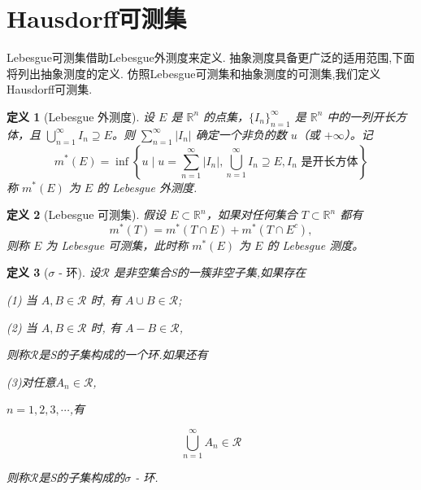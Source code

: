 \documentclass[hyperref,a4paper,UTF8]{ctexart}
\newtheorem{definition}{定义}[section]
\begin{document}






\section{Hausdorff可测集}

Lebesgue可测集借助Lebesgue外测度来定义. 
抽象测度具备更广泛的适用范围,下面将列出抽象测度的定义.
仿照Lebesgue可测集和抽象测度的可测集,我们定义Hausdorff可测集.

\begin{definition}[Lebesgue 外测度]

  设 $E$ 是 $\mathbb{R}^n$ 的点集，$\{I_n\}_{n=1}^{\infty}$ 是 $\mathbb{R}^n$ 中的一列开长方体，且 $\bigcup\limits_{n=1}^{\infty} I_n \supseteq E$。则 $\sum\limits_{n=1}^{\infty} |I_n|$ 确定一个非负的数 $u$（或 $+\infty$）。记
  \[ 
  m^*(E) = \inf \left\{ u \mid u = \sum_{n=1}^{\infty} |I_n| , \bigcup_{n=1}^{\infty} I_n \supseteq E, I_n \text{ 是开长方体} \right\} 
  \]
  称 $m^*(E)$ 为 $E$ 的 Lebesgue 外测度.
\end{definition}

\begin{definition}[Lebesgue 可测集]

  假设 \( E \subset \mathbb{R}^n \)，如果对任何集合 \( T \subset \mathbb{R}^n \) 都有
  \[ 
  m^*(T) = m^*(T \cap E) + m^*(T \cap E^c), 
  \]
  则称 \( E \) 为 Lebesgue 可测集，此时称 \( m^*(E) \) 为 \( E \) 的 Lebesgue 测度。
\end{definition}

\begin{definition}[$\sigma$ - 环]

  设$\mathscr{R}$ 是非空集合S的一簇非空子集,如果存在

  (1) 当 $A,B\in \mathscr{R}$ 时, 有 $A \cup B \in \mathscr{R}$;

  (2) 当 $A,B\in \mathscr{R}$ 时, 有 $A - B \in \mathscr{R}$,

  则称$\mathscr{R}$是S的子集构成的一个环.如果还有

  (3)对任意$A_n \in \mathscr{R}$,

  $n = 1,2,3,\cdots$,有

  \[
  \bigcup_{n=1}^{\infty} A_n \in \mathscr{R}
  \]
  
  则称$\mathscr{R}$是S的子集构成的$\sigma$ - 环.

\end{definition}
\end{document}
